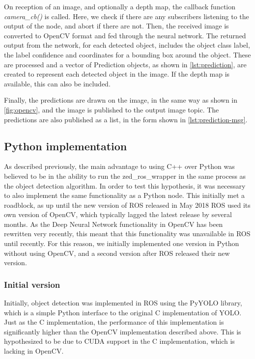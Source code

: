 \documentclass[\rootfolder/main.tex]{subfiles}
\begin{document}
On reception of an image, and optionally a depth map, the callback function \emph{camera\_cb()} is called.
Here, we check if there are any subscribers listening to the output of the node, and abort if there are not.
Then, the received image is converted to OpenCV format and fed through the neural network.
The returned output from the network, for each detected object, includes the object class label, the label confidence and coordinates for a bounding box around the object.
These are processed and a vector of Prediction objects, as shown in \cref{lst:prediction}, are created to represent each detected object in the image.
If the depth map is available, this can also be included.

Finally, the predictions are drawn on the image, in the same way as shown in \cref{fig:opencv}, and the image is published to the output image topic.
The predictions are also published as a list, in the form shown in \cref{lst:prediction-msg}.


\subsection{Python implementation}

As described previously, the main advantage to using C++ over Python was believed to be in the ability to run the zed\_ros\_wrapper in the same process as the object detection algorithm.
In order to test this hypothesis, it was necessary to also implement the same functionality as a Python node.
This initially met a roadblock, as up until the new version of ROS released in May 2018 ROS used its own version of OpenCV, which typically lagged the latest release by several months.
As the Deep Neural Network functionality in OpenCV has been rewritten very recently, this meant that this functionality was unavailable in ROS until recently.
For this reason, we initially implemented one version in Python without using OpenCV, and a second version after ROS released their new version.

\subsubsection{Initial version}

Initially, object detection was implemented in ROS using the PyYOLO library, which is a simple Python interface to the original C implementation of YOLO.
Just as the C implementation, the performance of this implementation is significantly higher than the OpenCV implementation described above.
This is hypothesized to be due to CUDA support in the C implementation, which is lacking in OpenCV.
\end{document}
